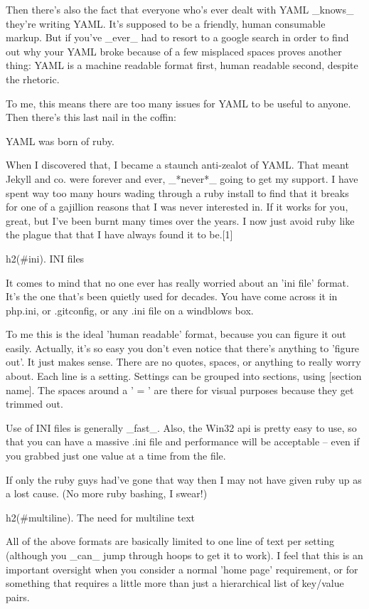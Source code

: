 Then there's also the fact that everyone who's ever dealt with YAML _knows_ they're writing YAML. It's supposed to be a friendly, human consumable markup. But if you've _ever_ had to resort to a google search in order to find out why your YAML broke because of a few misplaced spaces proves another thing: YAML is a machine readable format first, human readable second, despite the rhetoric. 

To me, this means there are too many issues for YAML to be useful to anyone. Then there's this last nail in the coffin:

YAML was born of ruby. 

When I discovered that, I became a staunch anti-zealot of YAML. That meant Jekyll and co. were forever and ever, _*never*_ going to get my support. I have spent way too many hours wading through a ruby install to find that it breaks for one of a gajillion reasons that I was never interested in. If it works for you, great, but I've been burnt many times over the years. I now just avoid ruby like the plague that that I have always found it to be.[1]

h2(#ini). INI files

It comes to mind that no one ever has really worried about an 'ini file' format. It's the one that's been quietly used for decades. You have come across it in php.ini, or .gitconfig, or any .ini file on a windblows box.


To me this is the ideal 'human readable' format, because you can figure it out easily. Actually, it's so easy you don't even notice that there's anything to 'figure out'. It just makes sense. There are no quotes, spaces, or anything to really worry about. Each line is a setting. Settings can be grouped into sections, using [section name]. The spaces around a ' = ' are there for visual purposes because they get trimmed out. 

Use of INI files is generally _fast_. Also, the Win32 api is pretty easy to use, so that you can have a massive .ini file and performance will be acceptable -- even if you grabbed just one value at a time from the file.

If only the ruby guys had've gone that way then I may not have given ruby up as a lost cause. (No more ruby bashing, I swear!)

h2(#multiline). The need for multiline text

All of the above formats are basically limited to one line of text per setting (although you _can_ jump through hoops to get it to work). I feel that this is an important oversight when you consider a normal 'home page' requirement, or for something that requires a little more than just a hierarchical list of key/value pairs. 

